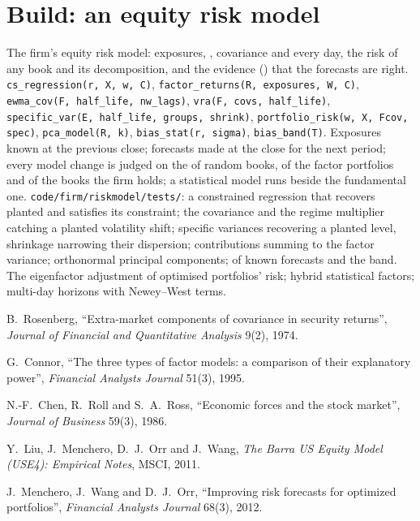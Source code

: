 \section{Build: an equity risk model}\label{bld:rs:risk-models:riskmodel}

\begin{build}
 The firm's equity risk model: exposures, , covariance and  every day, the risk of any book and its decomposition,
and the evidence () that the forecasts are right.
 \texttt{cs\_regression(r, X, w, C)}, \texttt{factor\_returns(R, exposures, W, C)}, \texttt{ewma\_cov(F, half\_life, nw\_lags)},
\texttt{vra(F, covs, half\_life)}, \texttt{specific\_var(E, half\_life, groups, shrink)}, \texttt{portfolio\_risk(w, X, Fcov, spec)}, \texttt{pca\_model(R, k)},
\texttt{bias\_stat(r, sigma)}, \texttt{bias\_band(T)}.
 Exposures known at the previous close; forecasts made at the close for the next period; every model change is judged on the  of
random books, of the factor portfolios and of the books the firm holds; a statistical model runs beside the fundamental one.
 \texttt{code/firm/riskmodel/tests/}: a constrained regression that recovers planted  and satisfies its constraint; the
covariance and the regime multiplier catching a planted volatility shift; specific variances recovering a planted level, shrinkage narrowing their dispersion;
contributions summing to the factor variance; orthonormal principal components;  of known forecasts and the band.
 The eigenfactor adjustment of optimised portfolios' risk; hybrid statistical factors; multi-day horizons with Newey--West terms.
\end{build}

\begin{omsources}
\item B.~Rosenberg, ``Extra-market components of covariance in security returns'', \emph{Journal of Financial and Quantitative Analysis} 9(2), 1974.
\item G.~Connor, ``The three types of factor models: a comparison of their explanatory power'', \emph{Financial Analysts Journal} 51(3), 1995.
\item N.-F.~Chen, R.~Roll and S.~A.~Ross, ``Economic forces and the stock market'', \emph{Journal of Business} 59(3), 1986.
\item Y.~Liu, J.~Menchero, D.~J.~Orr and J.~Wang, \emph{The Barra US Equity Model (USE4): Empirical Notes}, MSCI, 2011.
\item J.~Menchero, J.~Wang and D.~J.~Orr, ``Improving risk forecasts for optimized portfolios'', \emph{Financial Analysts Journal} 68(3), 2012.
\end{omsources}

